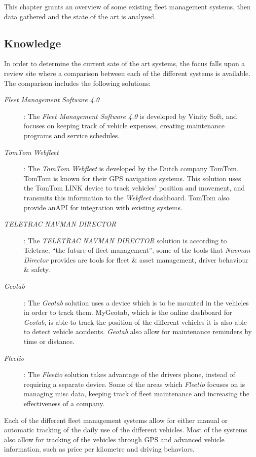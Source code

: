 This chapter grants an overview of some existing fleet management systems, then data gathered and the state of the art is analysed.

\subsection{Knowledge}\label{sub:Knowledge}
In order to determine the current sate of the art systems, the focus falls upon a review site where a comparison between each of the different systems is available\cite{top20fleetmanagement}.
The comparison includes the following solutions:
\begin{description}
    \item [\textit{Fleet Management Software 4.0}]\cite{vinitysoft}: The \textit{Fleet Management Software 4.0} is developed by Vinity Soft, and focuses on keeping track of vehicle expenses, creating maintenance programs and service schedules.
    \item [\textit{TomTom Webfleet}]\cite{tomtom}: The \textit{TomTom Webfleet} is developed by the Dutch company TomTom. TomTom is known for their GPS navigation systems. This solution uses the TomTom LINK device to track vehicles' position and movement, and transmits this information to the \textit{Webfleet} dashboard. TomTom also provide anAPI for integration with existing systems.
    \item [\textit{TELETRAC NAVMAN DIRECTOR}]\cite{teletracnavman}: The \textit{TELETRAC NAVMAN DIRECTOR} solution is according to Teletrac, \enquote{the future of fleet management}, some of the tools that \textit{Navman Director} provides are tools for fleet \& asset management, driver behaviour \& safety.
    \item [\textit{Geotab}]\cite{geotab}: The \textit{Geotab} solution uses a device which is to be mounted in the vehicles in order to track them. MyGeotab, which is the online dashboard for \textit{Geotab}, is able to track the position of the different vehicles it is also able to detect vehicle accidents.
    \textit{Geotab} also allow for maintenance reminders by time or distance.
    \item [\textit{Fleetio}]\cite{fleetio}: The \textit{Fleetio} solution takes advantage of the drivers phone, instead of requiring a separate device. Some of the areas which \textit{Fleetio} focuses on is managing misc data, keeping track of fleet maintenance and increasing the effectiveness of a company.
\end{description}
Each of the different fleet management systems allow for either manual or automatic tracking of the daily use of the different vehicles.
Most of the systems also allow for tracking of the vehicles through GPS and advanced vehicle information, such as price per kilometre and driving behaviors.

